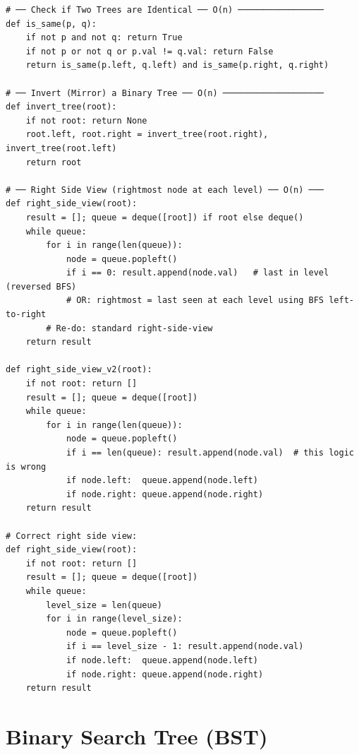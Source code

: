 \documentclass[11pt,a4paper]{report}
\begin{document}
\begin{lstlisting}
# ── Check if Two Trees are Identical ── O(n) ─────────────────
def is_same(p, q):
    if not p and not q: return True
    if not p or not q or p.val != q.val: return False
    return is_same(p.left, q.left) and is_same(p.right, q.right)

# ── Invert (Mirror) a Binary Tree ── O(n) ────────────────────
def invert_tree(root):
    if not root: return None
    root.left, root.right = invert_tree(root.right), invert_tree(root.left)
    return root

# ── Right Side View (rightmost node at each level) ── O(n) ───
def right_side_view(root):
    result = []; queue = deque([root]) if root else deque()
    while queue:
        for i in range(len(queue)):
            node = queue.popleft()
            if i == 0: result.append(node.val)   # last in level (reversed BFS) 
            # OR: rightmost = last seen at each level using BFS left-to-right
        # Re-do: standard right-side-view
    return result

def right_side_view_v2(root):
    if not root: return []
    result = []; queue = deque([root])
    while queue:
        for i in range(len(queue)):
            node = queue.popleft()
            if i == len(queue): result.append(node.val)  # this logic is wrong
            if node.left:  queue.append(node.left)
            if node.right: queue.append(node.right)
    return result

# Correct right side view:
def right_side_view(root):
    if not root: return []
    result = []; queue = deque([root])
    while queue:
        level_size = len(queue)
        for i in range(level_size):
            node = queue.popleft()
            if i == level_size - 1: result.append(node.val)
            if node.left:  queue.append(node.left)
            if node.right: queue.append(node.right)
    return result
\end{lstlisting}

\section{Binary Search Tree (BST)}
\end{document}

